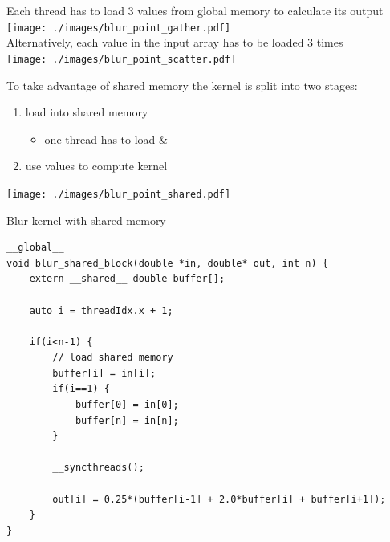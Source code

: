 \begin{frame}[fragile]{}
    \centering
    Each thread has to load 3 values from global memory to calculate its output \\
    \texttt{[image: ./images/blur\_point\_gather.pdf]} \\
    Alternatively, each value in the input array has to be loaded 3 times \\
    \texttt{[image: ./images/blur\_point\_scatter.pdf]} \\
\end{frame}

\begin{frame}[fragile]{}
    To take advantage of shared memory the kernel is split into two stages:
    \begin{enumerate}
        \item load  into shared memory 
        \begin{itemize}
            \item one thread has to load  \& 
        \end{itemize}
        \item use values  to compute kernel
    \end{enumerate}

    \begin{center}
        \texttt{[image: ./images/blur\_point\_shared.pdf]}
    \end{center}
\end{frame}

\begin{frame}[fragile]{}
    \begin{code}{Blur kernel with shared memory}
        \begin{lstlisting}[style=boxcudatiny]
__global__
void blur_shared_block(double *in, double* out, int n) {
    extern __shared__ double buffer[];

    auto i = threadIdx.x + 1;

    if(i<n-1) {
        // load shared memory
        buffer[i] = in[i];
        if(i==1) {
            buffer[0] = in[0];
            buffer[n] = in[n];
        }

        __syncthreads();

        out[i] = 0.25*(buffer[i-1] + 2.0*buffer[i] + buffer[i+1]);
    }
}
        \end{lstlisting}
    \end{code}

\end{frame}

